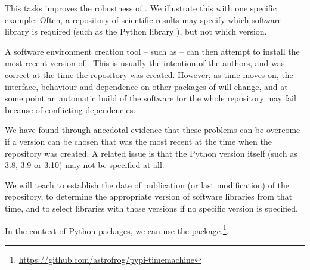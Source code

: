 \begin{task}[
  title=repo2docker development,
  id=repo2docker-timemachine,
  lead=SRL,
  PM=12,
  partners={QS}
]

This tasks improves the robustness of \repotodocker{}. We illustrate this with one specific example: 
Often, a repository of scientific results may
specify which software library is required (such as the Python library
), but not which version.

A software environment creation tool -- such as \repotodocker{} -- can then
attempt to install the most recent version of . This is
usually the intention of the authors, and was correct at the time the repository
was created. However, as time moves on, the interface, behaviour and dependence
on other packages of  will change, and at some point an
automatic build of the software for the whole repository may fail because of
conflicting dependencies.

We have found through anecdotal evidence that these problems can be
overcome if a  version can be chosen that was the
most recent at the time when the repository was created. A related
issue is that the Python version itself (such as 3.8, 3.9 or 3.10) may
not be specified at all.

We will teach \repotodocker{} to establish the date of publication
(or last modification) of the repository, to determine the appropriate version
of software libraries from that time, and to select libraries with those
versions if no specific version is specified.

In the context of Python packages, we can use the
package.\footnote{\url{https://github.com/astrofrog/pypi-timemachine}}.

\end{task}
